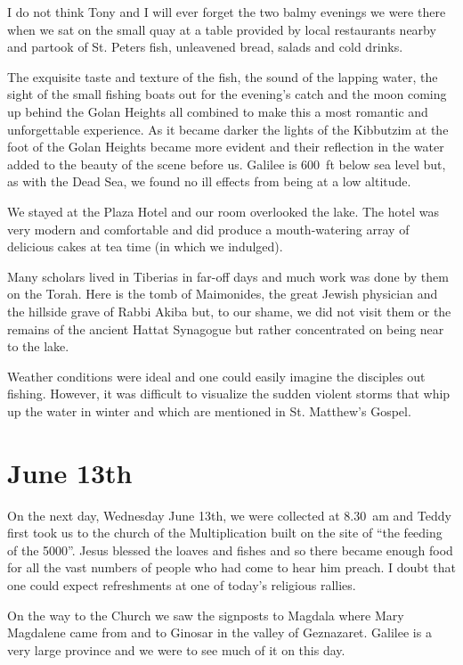 I do not think Tony and I will ever forget the two balmy evenings we
were there when we sat on the small quay at a table provided by local
restaurants nearby and partook of St. Peters fish, unleavened bread,
salads and cold drinks.

The exquisite taste and texture of the fish, the sound of the lapping
water, the sight of the small fishing boats out for the evening's
catch and the moon coming up behind the Golan Heights all combined to
make this a most romantic and unforgettable experience. As it became
darker the lights of the Kibbutzim at the foot of the Golan Heights
became more evident and their reflection in the water added to the
beauty of the scene before us. Galilee is 600~ft below sea level but,
as with the Dead Sea, we found no ill effects from being at a low
altitude.

We stayed at the Plaza Hotel and our room overlooked the lake. The
hotel was very modern and comfortable and did produce a mouth-watering
array of delicious cakes at tea time (in which we indulged).

Many scholars lived in Tiberias in far-off days and much work was done
by them on the Torah. Here is the tomb of Maimonides, the great Jewish
physician and the hillside grave of Rabbi Akiba but, to our shame, we
did not visit them or the remains of the ancient Hattat Synagogue but
rather concentrated on being near to the lake.

Weather conditions were ideal and one could easily imagine the
disciples out fishing. However, it was difficult to visualize the
sudden violent storms that whip up the water in winter and which are
mentioned in St. Matthew's Gospel.


\section{June 13th}

On the next day, Wednesday June 13th, we were collected at 8.30~am and
Teddy first took us to the church of the Multiplication built on the
site of ``the feeding of the 5000''. Jesus blessed the loaves and
fishes and so there became enough food for all the vast numbers of
people who had come to hear him preach. I doubt that one could expect
refreshments at one of today's religious rallies.

On the way to the Church we saw the signposts to Magdala where Mary
Magdalene came from and to Ginosar in the valley of
Geznazaret. Galilee is a very large province and we were to see much
of it on this day.

